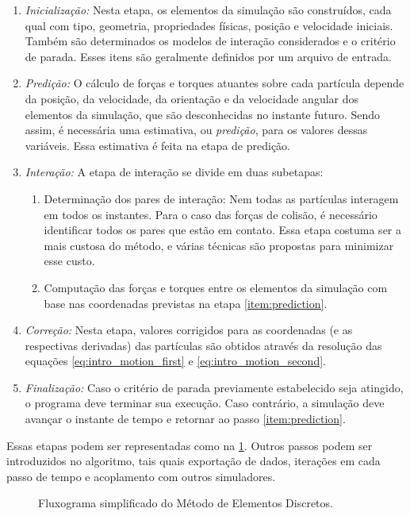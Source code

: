 \begin{enumerate} 
	\item \textit{Inicialização:} Nesta etapa, os elementos da simulação são construídos, cada qual com tipo, geometria, propriedades físicas, posição e velocidade iniciais. Também são determinados os modelos de interação considerados e o critério de parada. Esses itens são geralmente definidos por um arquivo de entrada. 
	\item \textit{Predição:} O cálculo de forças e torques atuantes sobre cada partícula depende da posição, da velocidade, da orientação e da velocidade angular dos elementos da simulação, que são desconhecidas no instante futuro. Sendo assim, é necessária uma estimativa, ou \textit{predição}, para os valores dessas variáveis. Essa estimativa é feita na etapa de predição. \label{item:prediction} 
	\item \textit{Interação:} A etapa de interação se divide em duas subetapas: 
	\begin{enumerate} 
		\item Determinação dos pares de interação: Nem todas as partículas interagem em todos os instantes. Para o caso das forças de colisão, é necessário identificar todos os pares que estão em contato. Essa etapa costuma ser a mais custosa do método, e várias técnicas são propostas para minimizar esse custo. 
		\item Computação das forças e torques entre os elementos da simulação com base nas coordenadas previstas na etapa \ref{item:prediction}.
	\end{enumerate} 
	\item \textit{Correção:} Nesta etapa, valores corrigidos para as coordenadas (e as respectivas derivadas) das partículas são obtidos através da resolução das equações \eqref{eq:intro_motion_first} e \eqref{eq:intro_motion_second}. 
	\item \textit{Finalização:} Caso o critério de parada previamente estabelecido seja atingido, o programa deve terminar sua execução. Caso contrário, a simulação deve avançar o instante de tempo e retornar ao passo \ref{item:prediction}. 
\end{enumerate} 

Essas etapas podem ser representadas como na \cref{fig:simple_dem_algorithm}. Outros passos podem ser introduzidos no algoritmo, tais quais exportação de dados, iterações em cada passo de tempo e acoplamento com outros simuladores.

\begin{figure}[h]
	\caption{Fluxograma simplificado do Método de Elementos Discretos.}
	\centering
		
	\label{fig:simple_dem_algorithm}
	\sourceMe
\end{figure}

